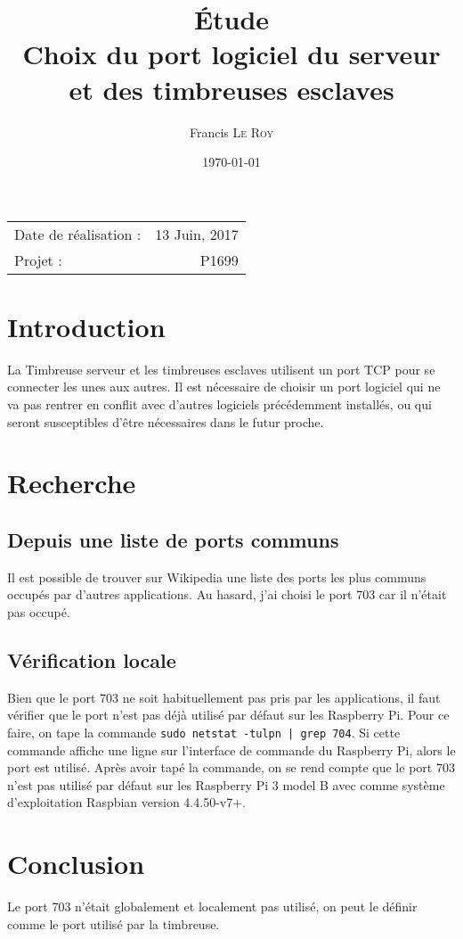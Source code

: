 \documentclass[10pt,a4paper,onecolumn]{article}
\title{Étude \\ Choix du port logiciel du serveur \\ et des timbreuses esclaves}
\author{Francis \textsc{Le Roy}}
\date{\today}
\begin{document}
\maketitle
\thispagestyle{fancy}

\begin{center}
\begin{tabular}{l r}
Date de réalisation : & 13 Juin, 2017 \\
Projet : & P1699 \\
\end{tabular}
\end{center}


\section{Introduction}
La Timbreuse serveur et les timbreuses esclaves utilisent un port TCP pour se connecter les unes aux autres. Il est nécessaire de choisir un port logiciel qui ne va pas rentrer en conflit avec d'autres logiciels précédemment installés, ou qui seront susceptibles d'être nécessaires dans le futur proche.
\section{Recherche}
\subsection{Depuis une liste de ports communs}
Il est possible de trouver sur Wikipedia\cite{Wikipedia} une liste des ports les plus communs occupés par d'autres applications. Au hasard, j'ai choisi le port 703 car il n'était pas occupé.
\subsection{Vérification locale}
Bien que le port 703 ne soit habituellement pas pris par les applications, il faut vérifier que le port n'est pas déjà utilisé par défaut sur les Raspberry Pi. Pour ce faire, on tape la commande \texttt{sudo netstat -tulpn | grep 704}. Si cette commande affiche une ligne sur l'interface de commande du Raspberry Pi, alors le port est utilisé. Après avoir tapé la commande, on se rend compte que le port 703 n'est pas utilisé par défaut sur les Raspberry Pi 3 model B avec comme système d'exploitation Raspbian version 4.4.50-v7+.

\section{Conclusion}
Le port 703 n'était globalement et localement pas utilisé, on peut le définir comme le port utilisé par la timbreuse.

\printbibliography
\end{document}
